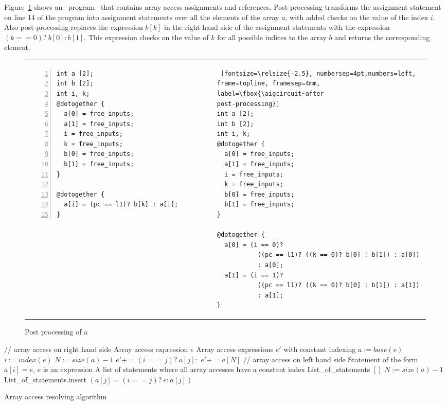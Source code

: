 Figure~\ref{fig:trans:arrays} shows an \thislanguage~program 
\aigcircuit~that contains array access assignments and 
references. Post-processing transforms the assignment
statement on line 14 of the program \aigcircuit into 
assignment statements over all the elements of the
array $a$, with added checks on the value of the index
$i$. Also post-processing replaces the expression $b[k]$ 
in the right hand side of the assignment statements 
with the expression $(k==0)?~b[0] : b[1]$. This expression
checks on the value of $k$ for all possible indices to the 
array $b$ and returns the corresponding
element. 

\begin{figure}[bt]
\centering
\begin{tabular}{p{}|p{0.01in}p{}}
\begin{Verbatim}[fontsize=\relsize{-2.5}, numbersep=4pt,numbers=left,
frame=topline, framesep=4mm, label=\fbox{Program \aigcircuit}]
int a [2];
int b [2];
int i, k;
@dotogether {
  a[0] = free_inputs;
  a[1] = free_inputs;
  i = free_inputs;
  k = free_inputs;
  b[0] = free_inputs;
  b[1] = free_inputs;
}
 
@dotogether {
  a[i] = (pc == l1)? b[k] : a[i];
}
\end{Verbatim}
& &
\begin{Verbatim} [fontsize=\relsize{-2.5}, numbersep=4pt,numbers=left,
frame=topline, framesep=4mm, label=\fbox{\aigcircuit~after
post-processing}]
int a [2];
int b [2];
int i, k;
@dotogether {
  a[0] = free_inputs;
  a[1] = free_inputs;
  i = free_inputs;
  k = free_inputs;
  b[0] = free_inputs;
  b[1] = free_inputs;
}
 
@dotogether {
  a[0] = (i == 0)? 
           ((pc == l1)? ((k == 0)? b[0] : b[1]) : a[0]) 
           : a[0];
  a[1] = (i == 1)? 
           ((pc == l1)? ((k == 0)? b[0] : b[1]) : a[1]) 
           : a[1];
}
\end{Verbatim}
\end{tabular}
\caption{Post processing of a \thislanguage~\aigcircuit}
\label{fig:trans:arrays}
\end{figure}


\begin{algorithm}[h!]
 \begin{algorithmic}[1]
  \State // array access on right hand side
  Array access expression $e$
   Array access expressions $e'$ with 
  constant indexing
  \State $a := base(e)$
  \State $i := index(e)$
  \State $N := size(a) - 1$
   \State $e' += (i == j)?~ a[j] :$
  \EndFor
  \State $e' += a[N]$
  \State
  \State // array access on left hand side
   Statement of the form $a[i] = e$, 
  $e$ is an expression
   A list of statements where all array accesses have a constant index 
  \State List\_of\_statements $[ ]$
  \State $N := size(a) - 1$
   \State List\_of\_statements.insert $(a[j] = (i == j)?~ e : a[j])$
  \EndFor
 \end{algorithmic}
 \caption{Array access resolving algorithm}
 \label{alg:resolv_target_exp}
\end{algorithm}

